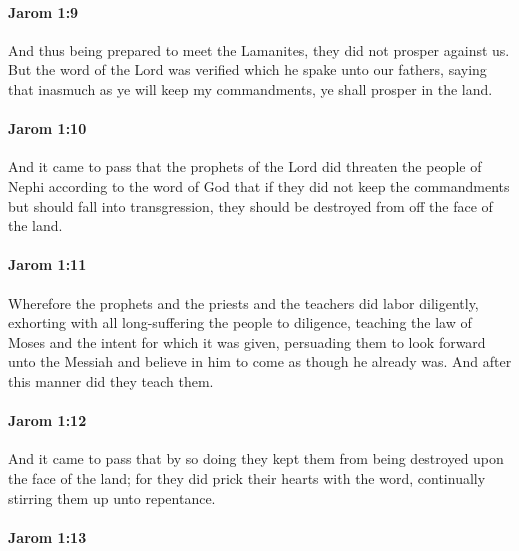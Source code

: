 		\paragraph{Jarom 1:9} %
			\label{JAROM-1-9}

			And thus being prepared to meet the Lamanites,
			they did not prosper against us.
			But the word of the Lord was verified which he spake unto our fathers,
			saying that inasmuch as ye will keep my commandments,
			ye shall prosper in the land.

		\paragraph{Jarom 1:10} %
			\label{JAROM-1-10}

			And it came to pass that the prophets of the Lord
			did threaten the people of Nephi according to the word of God
			that if they did not keep the commandments but should fall into transgression,
			they should be destroyed from off the face of the land.

		\paragraph{Jarom 1:11} %
			\label{JAROM-1-11}

			Wherefore the prophets and the priests and the teachers did labor diligently,
			exhorting with all long-suffering the people to diligence,
			teaching the law of Moses and the intent for which it was given,
			persuading them to look forward unto the Messiah
			and believe in him to come as though he already was.
			And after this manner did they teach them.

		\paragraph{Jarom 1:12} %
			\label{JAROM-1-12}

			And it came to pass that by so doing
			they kept them from being destroyed upon the face of the land;
			for they did prick their hearts with the word,
			continually stirring them up unto repentance.

		\paragraph{Jarom 1:13} %
			\label{JAROM-1-13}

